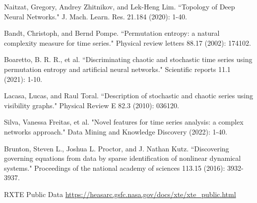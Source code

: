 \documentclass[journal]{IEEEtran}
\begin{document}
\begin{thebibliography}{1}
Naitzat, Gregory, Andrey Zhitnikov, and Lek-Heng Lim. ``Topology of Deep Neural Networks." J. Mach. Learn. Res. 21.184 (2020): 1-40.

Bandt, Christoph, and Bernd Pompe. ``Permutation entropy: a natural complexity measure for time series." Physical review letters 88.17 (2002): 174102.

Boaretto, B. R. R., et al. ``Discriminating chaotic and stochastic time series using permutation entropy and artificial neural networks." Scientific reports 11.1 (2021): 1-10.

Lacasa, Lucas, and Raul Toral. ``Description of stochastic and chaotic series using visibility graphs." Physical Review E 82.3 (2010): 036120.

Silva, Vanessa Freitas, et al. "Novel features for time series analysis: a complex networks approach." Data Mining and Knowledge Discovery (2022): 1-40.

Brunton, Steven L., Joshua L. Proctor, and J. Nathan Kutz. ``Discovering governing equations from data by sparse identification of nonlinear dynamical systems." Proceedings of the national academy of sciences 113.15 (2016): 3932-3937.



RXTE Public Data \url{https://heasarc.gsfc.nasa.gov/docs/xte/xte_public.html}

\end{thebibliography}

	
\end{document}
